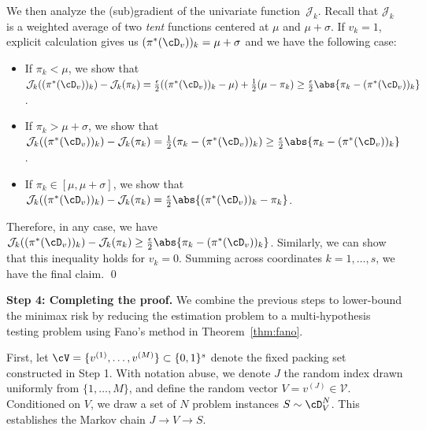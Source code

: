 \documentclass{article}
\theoremstyle{plain}
\theoremstyle{definition}
\theoremstyle{remark}
\begin{document}
    We then analyze the (sub)gradient of the univariate function~$\mathcal J_k$. Recall that $\mathcal J_k$ is a weighted average of two \textit{tent} functions centered at $\mu$ and $\mu + \sigma$. If $v_k = 1$, explicit calculation gives us $(\pi^*(\cD_v))_k = \mu + \sigma$ and we have the following case:
    \begin{itemize}[leftmargin=*]
        
        \item If $\pi_k < \mu$, we show that $\mathcal J_{k}((\pi^*(\cD_v))_k) - \mathcal J_k(\pi_k) = \frac{\epsilon}{2}((\pi^*(\cD_v))_k - \mu) + \frac{1}{2}(\mu - \pi_k) \geq \frac{\epsilon}{2}\abs{\pi_k - (\pi^*(\cD_v))_k}$.
        
        \item If $\pi_k > \mu + \sigma$, we show that $\mathcal J_{k}((\pi^*(\cD_v))_k) - \mathcal J_k(\pi_k) = \frac{1}{2}(\pi_k - (\pi^*(\cD_v))_k) \geq \frac{\epsilon}{2}\abs{\pi_k - (\pi^*(\cD_v))_k}$.
        
        
        \item If $\pi_k \in [\mu, \mu + \sigma]$, we show that $\mathcal J_k((\pi^*(\cD_v))_k) - \mathcal J_k(\pi_k) = \frac{\epsilon}{2}\abs{(\pi^*(\cD_v))_k - \pi_k}$.
    \end{itemize}
    Therefore, in any case, we have $\mathcal J_{k}((\pi^*(\cD_v))_k) - \mathcal J_k(\pi_k) \geq \frac{\epsilon}{2}\abs{\pi_k - (\pi^*(\cD_v))_k}$. Similarly, we can show that this inequality holds for $v_k = 0$. Summing across coordinates $k = 1, \dots, s$, we have the final claim. 
\qed


    \textbf{Step 4: Completing the proof.} We combine the previous steps to lower-bound the minimax risk by reducing the estimation problem to a multi-hypothesis testing problem using Fano's method in Theorem~\ref{thm:fano}. 
    
    First, let $\cV = \{v^{(1)}, \dots, v^{(M)}\} \subset \{0, 1\}^s$ denote the fixed packing set constructed in Step 1. With notation abuse, we denote $J$ the random index drawn uniformly from $\{1, \dots, M\}$, and define the random vector $V = v^{(J)} \in \mathcal V$. Conditioned on $V$, we draw a set of $N$ problem instances $S \sim \cD^N_V$. This establishes the Markov chain $J \rightarrow V \rightarrow S$.
\end{document}
